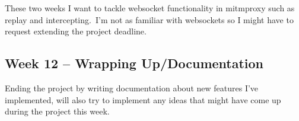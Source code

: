 These two weeks I want to tackle websocket functionality in mitmproxy such as replay and intercepting.\ I'm not
as familiar with websockets so I might have to request extending the project deadline.


\subsection{Week 12 -- Wrapping Up/Documentation}
\label{subsec:week-12}

Ending the project by writing documentation about new features I've implemented, will also try to implement any
ideas that might have come up during the project this week.\

